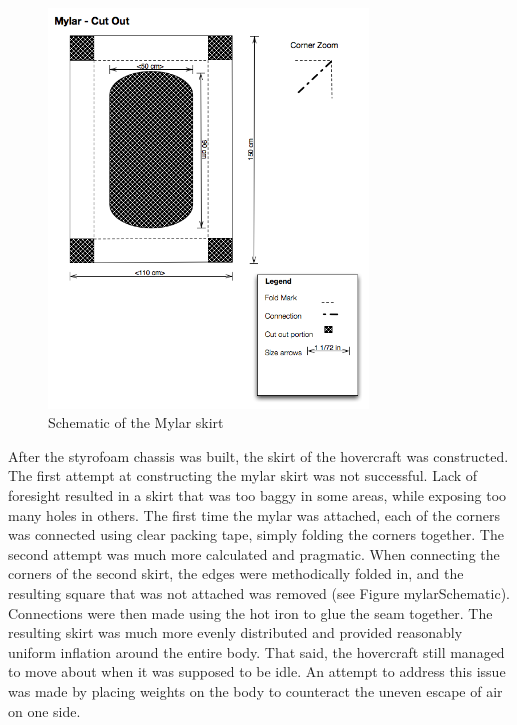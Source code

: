 \begin{figure}[h]
  \begin{center}
    \includegraphics[width=85mm]{imageSources/mylarSchematic.png}
  \end{center}
  \caption{Schematic of the Mylar skirt} 
  \label{mylarSchematic}
\end{figure}

After the styrofoam chassis was built, the skirt of the hovercraft was constructed. The first attempt at constructing the mylar skirt was not successful. Lack of foresight resulted in a skirt that was too baggy in some areas, while exposing too many holes in others. The first time the mylar was attached, each of the corners was connected using clear packing tape, simply folding the corners together. The second attempt was much more calculated and pragmatic. When connecting the corners of the second skirt, the edges were methodically folded in, and the resulting square that was not attached was removed (see Figure mylarSchematic). Connections were then made using the hot iron to glue the seam together. The resulting skirt was much more evenly distributed and provided reasonably uniform inflation around the entire body. That said, the hovercraft still managed to move about when it was supposed to be idle. An attempt to address this issue was made by placing weights on the body to counteract the uneven escape of air on one side.

